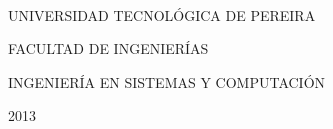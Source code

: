 \documentclass[letterpaper,12pt,oneside,pdftex]{icontec}
\begin{document}
\paragraph{}
\paragraph{}
\paragraph{}
\begin{center}
UNIVERSIDAD TECNOL\'OGICA DE PEREIRA
\end{center}
\begin{center}
FACULTAD DE INGENIER\'IAS
\end{center}
\begin{center}
INGENIER\'IA EN SISTEMAS Y COMPUTACI\'ON
\end{center}
\begin{center}
2013\\
\end{center}


\frontmatter
\tableofcontents
\mainmatter













\end{document}
